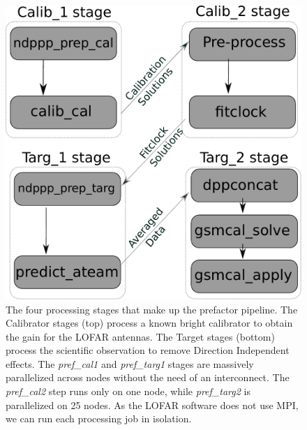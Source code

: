 \begin{figure}
    \includegraphics[width=0.95\linewidth]{ch4/figures/fig1/fig1.pdf}
      \caption{The four processing stages that make up the prefactor pipeline. The Calibrator stages (top) process a known bright calibrator to obtain the gain for the LOFAR antennas. The Target stages (bottom) process the scientific observation to remove Direction Independent effects. The \textit{pref\_cal1} and \textit{pref\_targ1} stages are massively parallelized across nodes without the need of an interconnect. The \textit{pref\_cal2} step runs only on one node, while \textit{pref\_targ2} is parallelized on 25 nodes. As the LOFAR software does not use MPI, we can run each processing job in isolation. }
	\label{fig:ch4_four_steps_box}
\end{figure}

